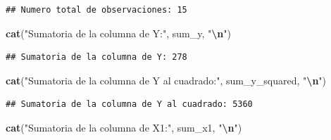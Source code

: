 \documentclass[
]{book}
\newenvironment{Shaded}{\begin{snugshade}}{\end{snugshade}}
\newcommand{\AttributeTok}[1]{\textcolor[rgb]{0.13,0.29,0.53}{#1}}
\newcommand{\CommentTok}[1]{\textcolor[rgb]{0.56,0.35,0.01}{\textit{#1}}}
\newcommand{\FunctionTok}[1]{\textcolor[rgb]{0.13,0.29,0.53}{\textbf{#1}}}
\newcommand{\NormalTok}[1]{#1}
\newcommand{\OtherTok}[1]{\textcolor[rgb]{0.56,0.35,0.01}{#1}}
\newcommand{\SpecialCharTok}[1]{\textcolor[rgb]{0.81,0.36,0.00}{\textbf{#1}}}
\newcommand{\StringTok}[1]{\textcolor[rgb]{0.31,0.60,0.02}{#1}}
\begin{document}
\begin{Shaded}
\end{Shaded}

\begin{verbatim}
## Numero total de observaciones: 15
\end{verbatim}

\begin{Shaded}
\begin{Highlighting}[]
\FunctionTok{cat}\NormalTok{(}\StringTok{"Sumatoria de la columna de Y:"}\NormalTok{, sum\_y, }\StringTok{"}\SpecialCharTok{\textbackslash{}n}\StringTok{"}\NormalTok{)}
\end{Highlighting}
\end{Shaded}

\begin{verbatim}
## Sumatoria de la columna de Y: 278
\end{verbatim}

\begin{Shaded}
\begin{Highlighting}[]
\FunctionTok{cat}\NormalTok{(}\StringTok{"Sumatoria de la columna de Y al cuadrado:"}\NormalTok{, sum\_y\_squared, }\StringTok{"}\SpecialCharTok{\textbackslash{}n}\StringTok{"}\NormalTok{)}
\end{Highlighting}
\end{Shaded}

\begin{verbatim}
## Sumatoria de la columna de Y al cuadrado: 5360
\end{verbatim}

\begin{Shaded}
\begin{Highlighting}[]
\FunctionTok{cat}\NormalTok{(}\StringTok{"Sumatoria de la columna de X1:"}\NormalTok{, sum\_x1, }\StringTok{"}\SpecialCharTok{\textbackslash{}n}\StringTok{"}\NormalTok{)}
\end{Highlighting}
\end{Shaded}
\end{document}

